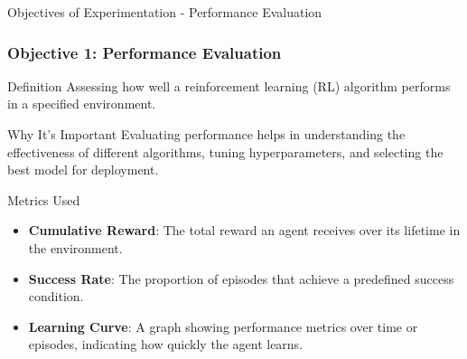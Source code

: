 \documentclass[aspectratio=169]{beamer}
\begin{document}
\begin{frame}[fragile]{Objectives of Experimentation - Performance Evaluation}
    \frametitle{Objective 1: Performance Evaluation}

    \begin{block}{Definition}
        Assessing how well a reinforcement learning (RL) algorithm performs in a specified environment.
    \end{block}

    \begin{block}{Why It's Important}
        Evaluating performance helps in understanding the effectiveness of different algorithms, tuning hyperparameters, and selecting the best model for deployment.
    \end{block}

    \begin{block}{Metrics Used}
        \begin{itemize}
            \item \textbf{Cumulative Reward}: The total reward an agent receives over its lifetime in the environment.
            \item \textbf{Success Rate}: The proportion of episodes that achieve a predefined success condition.
            \item \textbf{Learning Curve}: A graph showing performance metrics over time or episodes, indicating how quickly the agent learns.
        \end{itemize}
    \end{block}

\end{frame}
\end{document}
